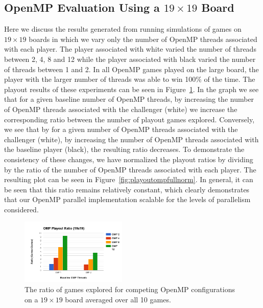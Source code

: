 \documentclass[nocopyrightspace, 10pt]{sigplanconf}
\begin{document}
\subsection{OpenMP Evaluation Using a $19 \times 19$ Board}

Here we discuss the results generated from running simulations of games on $19\times 19$ boards in which we vary only the number of OpenMP threads associated with each player. The player associated with white varied the number of threads between 2, 4, 8 and 12 while the player associated with black varied the number of threads between 1 and 2.  In all OpenMP games played on the large board, the player with the larger number of threads was able to win 100\% of the time. The playout results of these experiments can be seen in Figure~\ref{fig:playoutompfull}.  In the graph we see that for a given baseline number of OpenMP threads, by increasing the number of OpenMP threads associated with the challenger (white) we increase the corresponding ratio between the number of playout games explored.  Conversely, we see that by for a given number of OpenMP threads associated with the challenger (white), by increasing the number of OpenMP threads associated with the baseline player (black), the resulting ratio decreases.  To demonstrate the consistency of these changes, we have normalized the playout ratios by dividing by the ratio of the number of OpenMP threads associated with each player.  The resulting plot can be seen in Figure~\ref{fig:playoutompfullnorm}.  In general, it can be seen that this ratio remains relatively constant, which clearly demonstrates that our OpenMP parallel implementation scalable for the levels of parallelism considered.

\begin{figure}
\begin{center}
\includegraphics[width=0.45\textwidth]{omp_19_playout.png}
\end{center}
\caption{The ratio of games explored for competing OpenMP configurations on a $19 \times 19$ board averaged over all 10 games.}
\label{fig:playoutompfull}
\end{figure}
\end{document}
